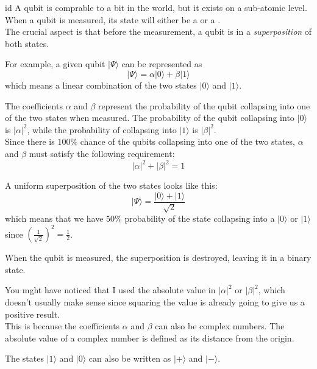 \documentclass[preview]{standalone}
\begin{document}
\genpage

\begin{snippet}{id}
    A qubit is comprable to a bit in the  world, but it exists on a sub-atomic level. \\
    When a qubit is measured, its state will either be a  or a . \\
    The crucial aspect is that before the measurement, a qubit is in a \textit{superposition} of both states.
    
    For example, a given qubit \(|\Psi\rangle\) can be represented as
    \[
        |\Psi\rangle=\alpha |0\rangle+\beta |1\rangle
    \]
    which means a linear combination of the two states \(|0\rangle\) and \(|1\rangle\).
    
    The coefficients \(\alpha\) and \(\beta\) represent the probability of the qubit collapsing into one of the two states when measured.
    The probability of the qubit collapsing into \(|0\rangle\) is \(|\alpha|^2\),
    while the probability of collapsing into \(|1\rangle\) is \(|\beta|^2\). \\
    Since there is \(100\%\) chance of the qubits collapsing into one of the two states, \(\alpha\) and \(\beta\) must satisfy the following requirement:
    \[
        |\alpha|^2+|\beta|^2=1
    \]
    
    A uniform superposition of the two states looks like this:
    \[
        |\Psi\rangle=\frac{|0\rangle+|1\rangle}{\sqrt{2}}
    \]
    which means that we have \(50\%\) probability of the state collapsing into a \(|0\rangle\) or \(|1\rangle\)
    since \({\left(\frac{1}{\sqrt{2}}\right)}^2=\frac{1}{2}\).
    
    When the qubit is measured, the superposition is destroyed, leaving it in a  binary state.
    
    You mght have noticed that I used the absolute value in \(|\alpha|^2\) or \(|\beta|^2\), which doesn't usually make sense since squaring the value is already going to give us a positive result.
    \\
    This is because the coefficients \(\alpha\) and \(\beta\) can also be complex numbers. The absolute value of a complex number is defined as its distance from the origin.
    
    The states \(|1\rangle\) and \(|0\rangle\) can also be written as \(|+\rangle\) and \(|-\rangle\).
\end{snippet}
\end{document}
